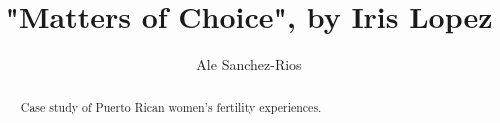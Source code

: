 \documentclass{tufte-handout}
\title{"Matters of Choice", by Iris Lopez\cite{Lopez2008MattersFreedom}}
\author[Ale Sanchez-Rios]{Ale Sanchez-Rios}
\begin{document}
\maketitle%

\begin{abstract}
\noindent Case study of Puerto Rican women's fertility experiences.
\end{abstract}


\end{document}
